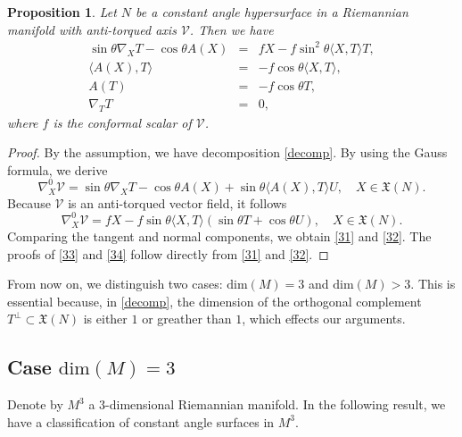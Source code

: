 \documentclass[12pt]{amsart}
\def\v{\mathcal V}
\def\x{\mathfrak X}
\newtheorem{proposition}[theorem]{Proposition}
\theoremstyle{definition}
\begin{document}
\begin{proposition} \label{p41}
Let $N$ be a constant angle hypersurface in a Riemannian manifold with anti-torqued axis $\v$. Then we have
\begin{eqnarray}
\sin \theta \nabla_X T -\cos \theta A(X)&=&fX-f\sin^2 \theta\langle X,T\rangle T, \label{31}\\ 
\langle A(X),T\rangle&=&-f\cos\theta\langle X,T\rangle,  \label{32}\\
A(T) &=&-f\cos\theta T, \label{33}\\
\nabla_T T&=&0, \label{34}
\end{eqnarray}
where $f$ is the conformal scalar of $\v$.
\end{proposition}
\begin{proof}
By the assumption, we have decomposition \eqref{decomp}. By using the Gauss formula, we derive
$$
\nabla^0_X \v =\sin \theta \nabla_X T -\cos \theta A(X)+\sin \theta \langle A(X),T\rangle U, \quad X\in  \mathfrak{X}(N).
$$
Because $\v$ is an anti-torqued vector field, it follows
$$
\nabla^0_X \v =fX-f\sin \theta\langle X,T\rangle (\sin \theta T +\cos \theta U), \quad X\in  \mathfrak{X}(N).
$$
Comparing the tangent and normal components, we obtain \eqref{31} and \eqref{32}. The proofs of \eqref{33} and \eqref{34} follow directly from \eqref{31} and \eqref{32}.
\end{proof}

From now on, we distinguish two cases: $\mbox{dim}(M)=3$ and $\mbox{dim}(M)>3$. This is essential because, in \eqref{decomp}, the dimension of the orthogonal complement $T^{\perp} \subset \x(N)$ is either $1$ or greather than $1$, which effects our arguments.

\subsection{Case $\mbox{dim}(M)=3$} Denote by $M^3$ a $3$-dimensional Riemannian manifold. In the following result, we have a classification of constant angle surfaces in $M^3$.
\end{document}
